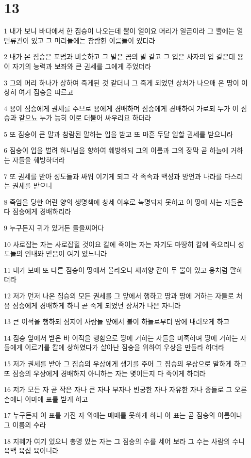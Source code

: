 \chapter{13}

\par 1 내가 보니 바다에서 한 짐승이 나오는데 뿔이 열이요 머리가 일곱이라 그 뿔에는 열 면류관이 있고 그 머리들에는 참람한 이름들이 있더라
\par 2 내가 본 짐승은 표범과 비슷하고 그 발은 곰의 발 같고 그 입은 사자의 입 같은데 용이 자기의 능력과 보좌와 큰 권세를 그에게 주었더라
\par 3 그의 머리 하나가 상하여 죽게된 것 같더니 그 죽게 되었던 상처가 나으매 온 땅이 이상히 여겨 짐승을 따르고
\par 4 용이 짐승에게 권세를 주므로 용에게 경배하며 짐승에게 경배하여 가로되 누가 이 짐승과 같으뇨 누가 능히 이로 더불어 싸우리요 하더라
\par 5 또 짐승이 큰 말과 참람된 말하는 입을 받고 또 마흔 두달 일할 권세를 받으니라
\par 6 짐승이 입을 벌려 하나님을 향하여 훼방하되 그의 이름과 그의 장막 곧 하늘에 거하는 자들을 훼방하더라
\par 7 또 권세를 받아 성도들과 싸워 이기게 되고 각 족속과 백성과 방언과 나라를 다스리는 권세를 받으니
\par 8 죽임을 당한 어린 양의 생명책에 창세 이후로 녹명되지 못하고 이 땅에 사는 자들은 다 짐승에게 경배하리라
\par 9 누구든지 귀가 있거든 들을찌어다
\par 10 사로잡는 자는 사로잡힐 것이요 칼에 죽이는 자는 자기도 마땅히 칼에 죽으리니 성도들의 인내와 믿음이 여기 있느니라
\par 11 내가 보매 또 다른 짐승이 땅에서 올라오니 새끼양 같이 두 뿔이 있고 용처럼 말하더라
\par 12 저가 먼저 나온 짐승의 모든 권세를 그 앞에서 행하고 땅과 땅에 거하는 자들로 처음 짐승에게 경배하게 하니 곧 죽게 되었던 상처가 나은 자니라
\par 13 큰 이적을 행하되 심지어 사람들 앞에서 불이 하늘로부터 땅에 내려오게 하고
\par 14 짐승 앞에서 받은 바 이적을 행함으로 땅에 거하는 자들을 미혹하며 땅에 거하는 자들에게 이르기를 칼에 상하였다가 살아난 짐승을 위하여 우상을 만들라 하더라
\par 15 저가 권세를 받아 그 짐승의 우상에게 생기를 주어 그 짐승의 우상으로 말하게 하고 또 짐승의 우상에게 경배하지 아니하는 자는 몇이든지 다 죽이게 하더라
\par 16 저가 모든 자 곧 작은 자나 큰 자나 부자나 빈궁한 자나 자유한 자나 종들로 그 오른손에나 이마에 표를 받게 하고
\par 17 누구든지 이 표를 가진 자 외에는 매매를 못하게 하니 이 표는 곧 짐승의 이름이나 그 이름의 수라
\par 18 지혜가 여기 있으니 총명 있는 자는 그 짐승의 수를 세어 보라 그 수는 사람의 수니 육백 육십 육이니라

